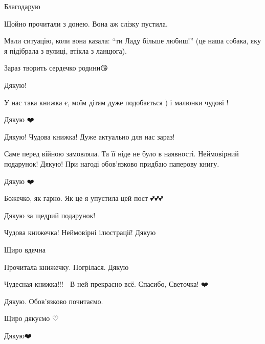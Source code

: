 
Благодарую🤗

Щойно прочитали з донею. Вона аж слізку пустила.

Мали ситуацію, коли вона казала: \enquote{ти Ладу більше любиш!} (це наша
собака, яку я підібрала з вулиці, втікла з ланцюга).

Зараз творить сердечко родини😘


Дякую!🤗


У нас така книжка є, моїм дітям дуже подобається ) і малюнки чудові !


Дякую ❤️


Дякую! Чудова книжка! Дуже актуально для нас зараз!


\obeycr
Саме перед війною замовляла.
Та її ніде не було в наявності.
Неймовірний подарунок! Дякую!
При нагоді обов'язково придбаю паперову книгу.
\restorecr


Дякую ❤️


Божечко, як гарно. Як це я упустила цей пост 💕💕💕


Дякую за щедрий подарунок!


Чудова книжечка! Неймовірні ілюстрації!
Дякую🌟


Щиро вдячна


Прочитала книжечку. Погрілася. Дякую 🙏


Чудесная книжка!!! 🤗 В ней прекрасно всё. Спасибо, Светочка! ❤️


Дякую. Обов'язково почитаємо.


Щиро дякуємо ♡


Дякую❤️🙏


